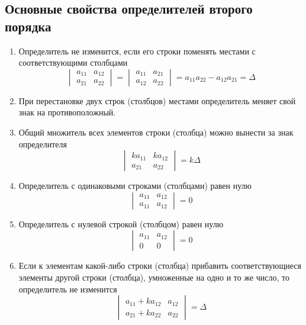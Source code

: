 \documentclass[12pt, a4paper]{article}
\begin{document}
    \subsection{Основные свойства определителей второго порядка}
    \begin{enumerate}
        \item Определитель не изменится, если его строки поменять местами с соответствующими столбцами \[
                \begin{vmatrix} a_{11} & a_{12} \\ a_{21} & a_{22}\end{vmatrix} = \begin{vmatrix} a_{11} & a_{21} \\ a_{12} & a_{22} \end{vmatrix} = a_{11}a_{22} - a_{12}a_{21} = \Delta
        \] 
        \item При перестановке двух строк (столбцов) местами определитель меняет свой знак на противоположный.
        \item Общий множитель всех элементов строки (столбца) можно вынести за знак определителя \[
                \begin{vmatrix} ka_{11} & ka_{12} \\ a_{21} & a_{22} \end{vmatrix} = k\Delta
        \] 
        \item Определитель с одинаковыми строками (столбцами) равен нулю \[
                \begin{vmatrix} a_{11} & a_{12} \\ a_{11} & a_{12}\end{vmatrix} = 0
        \] 
        \item Определитель с нулевой строкой (столбцом) равен нулю \[
                \begin{vmatrix} a_{11} & a_{12} \\ 0 & 0 \end{vmatrix} = 0
        \] 
        \item Если к элементам какой-либо строки (столбца) прибавить соответствующиеся элементы другой строки (столбца), умноженные на одно и то же число, то определитель не изменится \[
            \begin{vmatrix}
                a_{11} + ka_{12} & a_{12} \\ a_{21} + ka_{22} & a_{22}
            \end{vmatrix} = \Delta
        \] 
    \end{enumerate}
\end{document}
